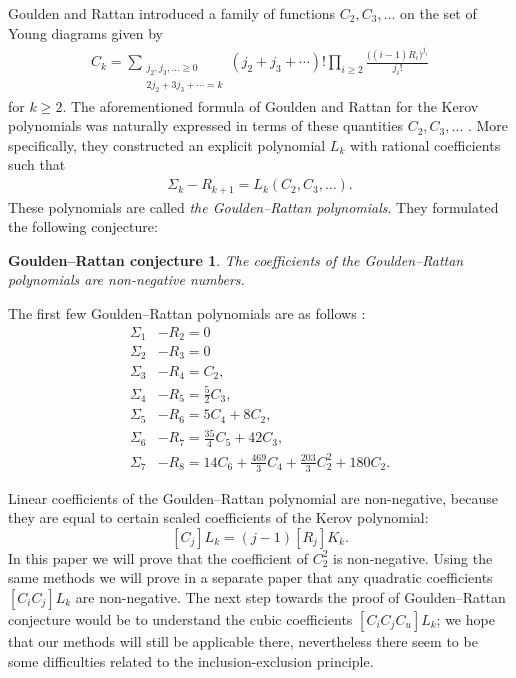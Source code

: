 \documentclass[submission]{FPSAC2021}
\newtheorem*{conjecture}{Goulden--Rattan conjecture}
\begin{document}
Goulden and Rattan \cite{GR05} introduced a family of functions 
$C_2,C_3,\dots$ on the set of Young diagrams given by
\begin{align}
\label{cformula}
C_k=\sum_{\substack{j_2,j_3,\ldots \geq 0 \\ 2j_2+3j_3+\cdots=k}}
(j_2+j_3+\cdots)!\prod_{i\geq 2} \frac{\big( (i-1)R_i\big)^{j_i}}{j_i!}
\end{align}
for $k\geq 2$.
The aforementioned formula of Goulden and Rattan for the Kerov polynomials 
was naturally expressed in terms of these 
quantities $C_2,C_3,\dots$ \cite{GR05}. 
More specifically, they constructed an explicit polynomial $L_k$ with
rational coefficients such that 
\begin{align}
\label{grpol}
\Sigma_k-R_{k+1}=L_k(C_2, C_3, \ldots).
\end{align}
These polynomials are called \emph{the Goulden--Rattan polynomials}. They formulated the following conjecture:
\begin{conjecture}
\label{hipotezaGR}
The coefficients of the Goulden--Rattan polynomials are non-negative numbers. 
\end{conjecture}
The first few Goulden--Rattan polynomials are as follows \cite{GR05}:
\begin{align*}
\Sigma_1&-R_2=0\\
\Sigma_2&-R_3=0\\
\Sigma_3&-R_4=C_2,\\
\Sigma_4&-R_5=\frac{5}{2}C_3,\\
\Sigma_5&-R_6=5C_4+8C_2,\\
\Sigma_6&-R_7=\frac{35}{4}C_5+42C_3,\\
\Sigma_7&-R_8=14C_6+\frac{469}{3}C_4+\frac{203}{3}C_2^2+180C_2.
\end{align*}

Linear coefficients of the Goulden--Rattan polynomial are non-negative, because
they are equal to certain scaled coefficients of the Kerov polynomial:
\[ [ C_j ] L_k=(j-1) [ R_j ] K_k. \]
In this
paper we will prove that the coefficient of $C_2^2$ is non-negative.
Using the same methods we will prove in a separate paper \cite{Mar21} that 
any quadratic coefficients $[ C_i C_j ] L_k$ are non-negative. 
The next step towards the proof of Goulden--Rattan conjecture would be to understand 
the cubic coefficients $ [ C_i C_j C_u ] L_k$; we hope that 
our methods will still be applicable there, nevertheless there seem to be 
some difficulties related to the inclusion-exclusion principle.
\end{document}

